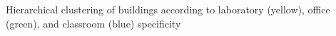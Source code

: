 Hierarchical clustering of buildings according to laboratory (yellow), office (green), and classroom (blue) specificity
\label{fig:specificity_high}